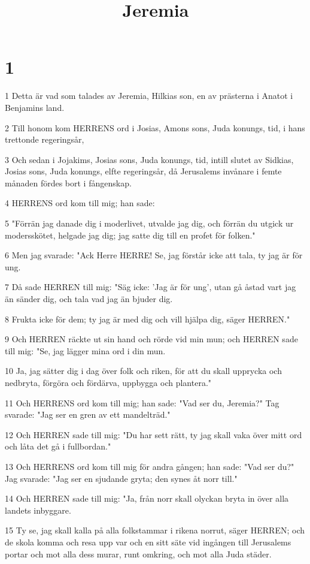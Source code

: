 

\title{Jeremia}


\chapter{1}

\par 1 Detta är vad som talades av Jeremia, Hilkias son, en av prästerna i Anatot i Benjamins land.
\par 2 Till honom kom HERRENS ord i Josias, Amons sons, Juda konungs, tid, i hans trettonde regeringsår,
\par 3 Och sedan i Jojakims, Josias sons, Juda konungs, tid, intill slutet av Sidkias, Josias sons, Juda konungs, elfte regeringsår, då Jerusalems invånare i femte månaden fördes bort i fångenskap.
\par 4 HERRENS ord kom till mig; han sade:
\par 5 "Förrän jag danade dig i moderlivet, utvalde jag dig, och förrän du utgick ur modersskötet, helgade jag dig; jag satte dig till en profet för folken."
\par 6 Men jag svarade: "Ack Herre HERRE! Se, jag förstår icke att tala, ty jag är för ung.
\par 7 Då sade HERREN till mig: "Säg icke: 'Jag är för ung', utan gå åstad vart jag än sänder dig, och tala vad jag än bjuder dig.
\par 8 Frukta icke för dem; ty jag är med dig och vill hjälpa dig, säger HERREN."
\par 9 Och HERREN räckte ut sin hand och rörde vid min mun; och HERREN sade till mig: "Se, jag lägger mina ord i din mun.
\par 10 Ja, jag sätter dig i dag över folk och riken, för att du skall upprycka och nedbryta, förgöra och fördärva, uppbygga och plantera."
\par 11 Och HERRENS ord kom till mig; han sade: "Vad ser du, Jeremia?" Tag svarade: "Jag ser en gren av ett mandelträd."
\par 12 Och HERREN sade till mig: "Du har sett rätt, ty jag skall vaka över mitt ord och låta det gå i fullbordan."
\par 13 Och HERRENS ord kom till mig för andra gången; han sade: "Vad ser du?" Jag svarade: "Jag ser en sjudande gryta; den synes åt norr till."
\par 14 Och HERREN sade till mig: "Ja, från norr skall olyckan bryta in över alla landets inbyggare.
\par 15 Ty se, jag skall kalla på alla folkstammar i rikena norrut, säger HERREN; och de skola komma och resa upp var och en sitt säte vid ingången till Jerusalems portar och mot alla dess murar, runt omkring, och mot alla Juda städer.
